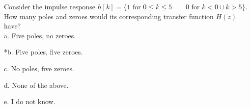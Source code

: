 
Consider the impulse response $ h\left\lbrack k \right\rbrack = \{ 1 \text{ for } 0 \leq k \leq 5 \qquad 0 \text{ for } k < 0 \cup k > 5 \}$. How many poles and zeroes would its corresponding transfer function $H(z)$ have? \\

a. Five poles, no zeroes.

*b. Five poles, five zeroes.

c. No poles, five zeroes.

d. None of the above.

e. I do not know. \\
